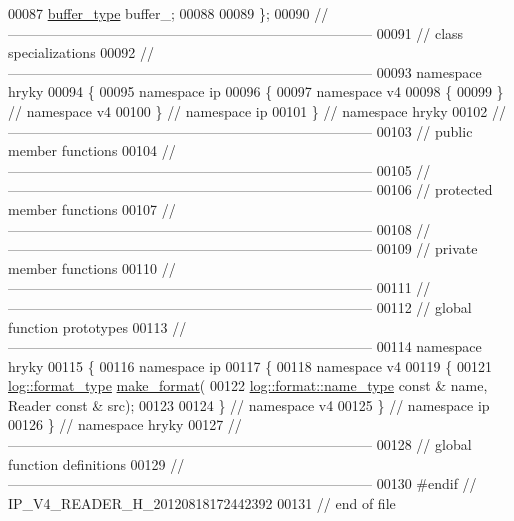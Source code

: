 \begin{DoxyCode}
00087     \hyperlink{classhryky_1_1_fixed_vector}{buffer_type}     buffer\_;
00088 
00089 \};
00090 \textcolor{comment}{//
      ------------------------------------------------------------------------------}
00091 \textcolor{comment}{// class specializations}
00092 \textcolor{comment}{//
      ------------------------------------------------------------------------------}
00093 \textcolor{keyword}{namespace }hryky
00094 \{
00095 \textcolor{keyword}{namespace }ip
00096 \{
00097 \textcolor{keyword}{namespace }v4
00098 \{
00099 \} \textcolor{comment}{// namespace v4}
00100 \} \textcolor{comment}{// namespace ip}
00101 \} \textcolor{comment}{// namespace hryky}
00102 \textcolor{comment}{//
      ------------------------------------------------------------------------------}
00103 \textcolor{comment}{// public member functions}
00104 \textcolor{comment}{//
      ------------------------------------------------------------------------------}
00105 \textcolor{comment}{//
      ------------------------------------------------------------------------------}
00106 \textcolor{comment}{// protected member functions}
00107 \textcolor{comment}{//
      ------------------------------------------------------------------------------}
00108 \textcolor{comment}{//
      ------------------------------------------------------------------------------}
00109 \textcolor{comment}{// private member functions}
00110 \textcolor{comment}{//
      ------------------------------------------------------------------------------}
00111 \textcolor{comment}{//
      ------------------------------------------------------------------------------}
00112 \textcolor{comment}{// global function prototypes}
00113 \textcolor{comment}{//
      ------------------------------------------------------------------------------}
00114 \textcolor{keyword}{namespace }hryky
00115 \{
00116 \textcolor{keyword}{namespace }ip
00117 \{
00118 \textcolor{keyword}{namespace }v4
00119 \{
00121     \hyperlink{namespacehryky_1_1log_ad50448c3f934f1eacd5c1bcffe8111e1}{log::format_type} \hyperlink{namespacehryky_afd615217f648ff164bc40fb82166d959}{make_format}(
00122         \hyperlink{namespacehryky_1_1log_1_1format_ab7408d1e2ed2d648dbf9bba69eb74288}{log::format::name_type} \textcolor{keyword}{const} & name, Reader \textcolor{keyword}{const} & src);
00123 
00124 \} \textcolor{comment}{// namespace v4}
00125 \} \textcolor{comment}{// namespace ip}
00126 \} \textcolor{comment}{// namespace hryky}
00127 \textcolor{comment}{//
      ------------------------------------------------------------------------------}
00128 \textcolor{comment}{// global function definitions}
00129 \textcolor{comment}{//
      ------------------------------------------------------------------------------}
00130 \textcolor{preprocessor}{#endif // IP\_V4\_READER\_H\_20120818172442392}
00131 \textcolor{preprocessor}{}\textcolor{comment}{// end of file}
\end{DoxyCode}
